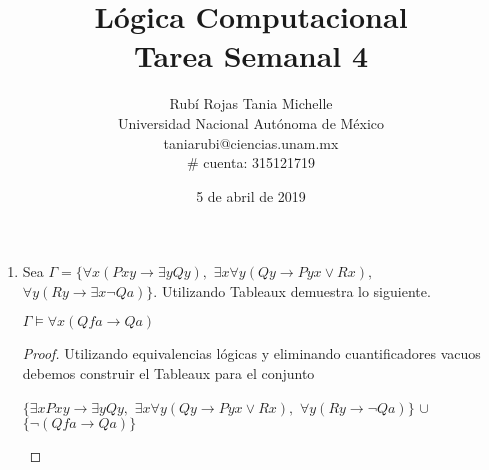 \documentclass[letterpaper,10pt]{article}
\title{Lógica Computacional \\ Tarea Semanal 4}
\author{Rubí Rojas Tania Michelle \\
        Universidad Nacional Autónoma de México \\
        taniarubi@ciencias.unam.mx \\
        \# cuenta: 315121719}
\date{5 de abril de 2019}
\begin{document}
\maketitle

\begin{enumerate}
    \item Sea $\Gamma = \{\forall x(P xy \rightarrow \exists y Qy), $
    $\exists x \forall y (Qy \rightarrow Pyx \lor Rx), $
    $\forall y(Ry \rightarrow \exists x \neg Qa)\}$.
    Utilizando Tableaux demuestra lo siguiente.
    
    \begin{center}
        $\Gamma \models \forall x (Qfa \rightarrow Qa)$
    \end{center}

    \begin{proof}
        Utilizando equivalencias lógicas y eliminando cuantificadores vacuos
        debemos construir el Tableaux para el conjunto
        
        \begin{center}
            $\{\exists x Pxy \rightarrow \exists y Qy, $
            $\exists x \forall y(Qy \rightarrow Pyx \lor Rx), $
            $\forall y(Ry \rightarrow \neg Qa)\}$ $\cup$ 
            $\{\neg (Qfa \rightarrow Qa)\}$
        \end{center}
        

\end{proof}
\end{enumerate}
\end{document}
